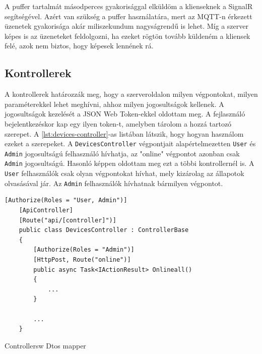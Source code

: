 A puffer tartalmát másodperces gyakorisággal elküldöm a klienseknek a SignalR segítségével. 
Azért van szükség a puffer használatára, mert az MQTT-n érkezett üzenetek gyakorisága akár miliszekundum nagyságrendű is lehet. 
Míg a szerver képes is az üzeneteket feldolgozni, ha ezeket rögtön tovább küldeném a kliensek felé, azok nem biztos, hogy képesek lennének rá.

\subsection{Kontrollerek}
A kontrollerek határozzák meg, hogy a szerveroldalon milyen végpontokat, milyen paraméterekkel lehet meghívni, ahhoz milyen jogosultságok kellenek.
A jogosultságok kezelését a JSON Web Token-ekkel oldottam meg. A fejlasználó bejelentkezéskor kap egy ilyen token-t, 
amelyben tárolom a hozzá tartozó szerepet. A \ref{lst:devices-controller}-as listában látszik, hogy hogyan használom ezeket a szerepeket.
A \verb+DevicesController+ végpontjait alapértelmezetten \verb+User+ és \verb+Admin+ jogosultságú felhasználó hívhatja, az "online" végpontot azonban csak \verb+Admin+ jogosultságú.
Hasonló képpen oldottam meg ezt a többi kontrollernél is. A \verb+User+ felhasználók csak olyan végpontokat hívhat, mely kizárolag az állapotok olvasásával jár.
Az \verb+Admin+ felhasználók hívhatnak bármilyen végpontot.

\begin{lstlisting}[caption=Az eszköz kontroller és annak "online" végpontja, label=lst:devices-controller]
    [Authorize(Roles = "User, Admin")]
    [ApiController]
    [Route("api/[controller]")]
    public class DevicesController : ControllerBase
    {
        [Authorize(Roles = "Admin")]
        [HttpPost, Route("online")]
        public async Task<IActionResult> Onlineall()
        {
            ...
        }

        ...
    }
\end{lstlisting}

Controllersw
Dtos
mapper